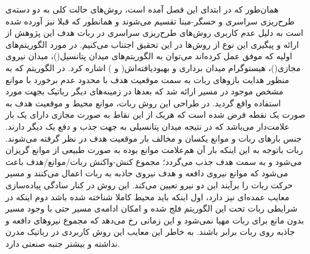 همان‌طور که در ابتدای این فصل آمده است، روش‌های  حالت کلی به دو دسته‌ی طرح‌ریزی سراسری و حسگر-مبنا تقسیم می‌شوند و همانطور که قبلا نیز آورده شده است به دلیل عدم کاربری روش‌های طرح‌ریزی سراسری در ربات هدف این پژوهش از ارائه و پیگیری این نوع از روش‌ها در این تحقیق اجتناب می‌کنیم. در مورد الگوریتم‌های اولیه که موفق عمل کرده‌اند می‌توان به الگوریتم‌های میدان پتانسیل()، میدان نیروی مجازی()، هیستوگرام میدان برداری و بهبودیافته‌اش( و ) اشاره کرد.
در الگوریتم  که به منظور هدایت بازوهای ربات به سمت موقعیت هدف با محدود عدم برخورد با موانع مشخص موجود در مسیر ارائه شد که بعدها در زمینه‌های دیگر رباتیک بجهت  مورد استفاده واقع گردید. در طراحی این روش ربات، موانع محیط و موقعیت هدف به صورت یک نقطه فرض شده است که هریک از این نقاط به صورت مجازی دارای یک بار علامت‌دار می‌باشد که در نتیجه میدان پتانسیلی به جهت جذب و دفع یک دیگر دارند. جنس بارهای ربات و موانع یکسان و مخالف بار موقعیت هدف در نظر گرفته می‌شوند. ربات باتوجه به این اینکه بار آن هم‌علامت موانع بوده به صورت طبیعی از موانع گریزان می‌شود و به سمت هدف جذب می‌گردد؛ مجموع کنش-واکنش ربات/موانع/هدف باعث می‌شود که موانع نیروی دافعه و هدف نیروی جاذبه به ربات اعمال می‌کنند و مسیر حرکت ربات را برآیند این دو نیرو تعیین می‌کند. این روش در کنار سادگی پیاده‌سازی معایب عمده‌ای نیز دارد، اول اینکه باید محیط کاملا شناخته شده باشد دوم اینکه در شرایطی ربات تحت این الگوریتم فلج شده و امکان ادامه‌ی مسیر حتی با وجود مسیر بدون مانع برای ربات مهیا نمی‌شود و این زمانی رخ می‌دهد که مجموع نیرو‌های دافعه و جاذبه روی ربات برابر باشند. به خاطر این معایب این روش کاربردی در رباتیک مدرن نداشته و بیشتر جنبه صنعتی دارد.
